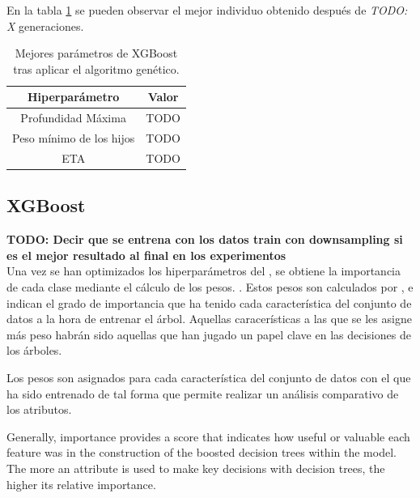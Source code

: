         En la tabla \ref{BestGASolutionTable} se pueden observar el mejor individuo obtenido después de \textit{TODO: X} generaciones.

        \begin{table}[H]
            \centering
                \begin{tabular}{ |c|c| } 
                    \hline
                    \textbf{Hiperparámetro} & \textbf{Valor}\\
                    \hline
                        Profundidad Máxima & TODO \\ 
                        Peso mínimo de los hijos & TODO \\ 
                        ETA & TODO \\ 
                    \hline

                \end{tabular}
            \caption{Mejores parámetros de XGBoost tras aplicar el algoritmo genético.}
            \label{BestGASolutionTable}
        \end{table}



    \subsection{XGBoost}


        \textbf{TODO: Decir que se entrena con los datos train con downsampling si es el mejor resultado al final en los experimentos}\\

        Una vez se han optimizados los hiperparámetros del , se obtiene la importancia de cada clase mediante el cálculo de los pesos. \cite{XGBoostFeatureWeightsMeaning}. Estos pesos son calculados por , e indican el grado de importancia que ha tenido cada característica del conjunto de datos a la hora de entrenar el árbol. Aquellas caracerísticas a las que se les asigne más peso habrán sido aquellas que han jugado un papel clave en las decisiones de los árboles.

        Los pesos son asignados para cada característica del conjunto de datos con el que ha sido entrenado  de tal forma que permite realizar un análisis comparativo de los atributos.


        Generally, importance provides a score that indicates how useful or valuable each feature was in the construction of the boosted decision trees within the model. The more an attribute is used to make key decisions with decision trees, the higher its relative importance.

